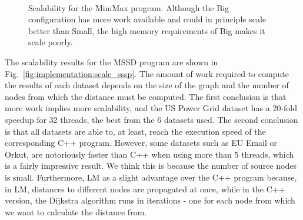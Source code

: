 \begin{figure}[]
\begin{subfigure}[b]{\plotsize\textwidth}
                \label{fig:implementation:scale_minmax_big}
        \end{subfigure}\\

        \caption{Scalability for the MiniMax program. Although the Big
           configuration has more work available and could in principle scale
           better than Small, the high memory requirements of Big makes it scale
           poorly.}

        \label{fig:implementation:scale_minmax}
\end{figure}

The scalability results for the MSSD program are shown in
Fig.~\ref{fig:implementation:scale_sssp}. The amount of work required to compute
the results of each dataset depends on the size of the graph and the number of
nodes from which the distance must be computed. The first conclusion is that
more work implies more scalability, and the US Power Grid dataset has a 20-fold
speedup for 32 threads, the best from the 6 datasets used. The second conclusion
is that all datasets are able to, at least, reach the execution speed of the
corresponding C++ program. However, some datasets such as EU Email or Orkut, are
notoriously faster than C++ when using more than 5 threads, which is a fairly
impressive result.  We think this is because the number of source nodes is
small. Furthermore, LM as a slight advantage over the C++ program because, in
LM, distances to different nodes are propagated at once, while in the C++
version, the Dijkstra algorithm runs in iterations - one for each node from
which we want to calculate the distance from.

